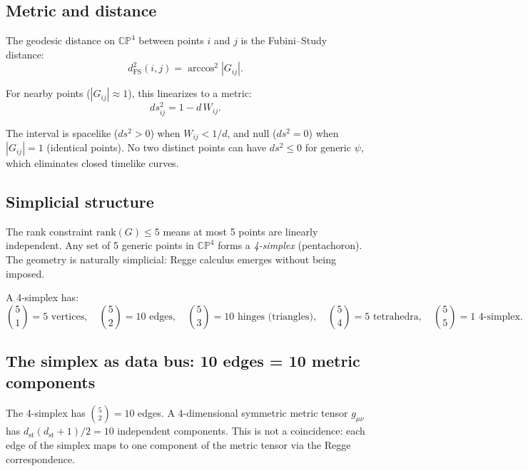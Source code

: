 \documentclass[12pt]{article}
\theoremstyle{remark}
\theoremstyle{definition}
\begin{document}
\subsection{Metric and distance}
\label{sec:metric}

The geodesic distance on $\mathbb{CP}^4$ between points $i$ and $j$ is the Fubini--Study distance:
\begin{equation}
d^2_\text{FS}(i, j) = \arccos^2|G_{ij}|.
\end{equation}

For nearby points ($|G_{ij}| \approx 1$), this linearizes to a metric:
\begin{equation}
ds^2_{ij} = 1 - d\,W_{ij}.
\end{equation}

The interval is spacelike ($ds^2 > 0$) when $W_{ij} < 1/d$, and null ($ds^2 = 0$) when $|G_{ij}| = 1$ (identical points). No two distinct points can have $ds^2 \leq 0$ for generic $\psi$, which eliminates closed timelike curves.

\subsection{Simplicial structure}
\label{sec:simplex}

The rank constraint $\text{rank}(G) \leq 5$ means at most 5 points are linearly independent. Any set of 5 generic points in $\mathbb{CP}^4$ forms a \emph{4-simplex} (pentachoron). The geometry is naturally simplicial: Regge calculus emerges without being imposed.

A 4-simplex has:
\begin{equation}
\binom{5}{1} = 5 \text{ vertices}, \quad
\binom{5}{2} = 10 \text{ edges}, \quad
\binom{5}{3} = 10 \text{ hinges (triangles)}, \quad
\binom{5}{4} = 5 \text{ tetrahedra}, \quad
\binom{5}{5} = 1 \text{ 4-simplex}.
\end{equation}

\subsection{The simplex as data bus: 10 edges = 10 metric components}
\label{sec:data_bus}

The 4-simplex has $\binom{5}{2} = 10$ edges. A 4-dimensional symmetric metric tensor $g_{\mu\nu}$ has $d_\text{st}(d_\text{st}+1)/2 = 10$ independent components. This is not a coincidence: each edge of the simplex maps to one component of the metric tensor via the Regge correspondence.
\end{document}
